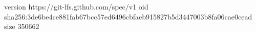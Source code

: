 version https://git-lfs.github.com/spec/v1
oid sha256:3de6be4ce881fab67bcc57ed6496cbfaeb915827b5d3447003b8fa06cae0cead
size 350662
